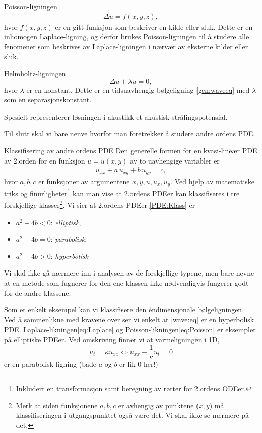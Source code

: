 \begin{eks}{Poisson-ligningen}
\begin{align}\label{eq:Poisson}
\Delta u = f(x, y, z),
\end{align}
hvor \( f(x, y, z) \) er en gitt funksjon som beskriver en kilde eller sluk. Dette er en inhomogen Laplace-ligning, og derfor brukes Poisson-ligningen til å studere alle fenomener som beskrives av Laplace-ligningen i nærvær av eksterne kilder eller sluk.
\end{eks}

\begin{eks}{Helmholtz-ligningen}
\[
\Delta u + \lambda u = 0, 
\]
hvor \( \lambda \) er en konstant. Dette er en tidsuavhengig bølgeligning \eqref{gen:waveeq} med \( \lambda \) som en separasjonskonstant. 
\end{eks}
Spesielt representerer løsningen i akustikk et akustisk strålingspotensial.

Til slutt skal vi bare nenve hvorfor man foretrekker å studere andre ordens PDE. 

\begin{oppsum}{Klassifisering av andre ordens PDE}
Den generelle formen for en kvasi-lineær PDE av 2.orden for en funksjon \( u = u(x, y) \) av to uavhengige variabler er
\begin{align}\label{PDE:Klass}
u_{xx} + a\, u_{xy} + b\, u_{yy} = c,
\end{align}
hvor \(a, b, c\) er funksjoner av argumentene \( x, y, u, u_x, u_y \).
Ved hjelp av matematiske triks og finurligheter\footnote{Inkludert en transformasjon samt beregning av røtter for 2.ordens ODEer.} kan man vise at 2.ordens PDEer kan klassifiseres i tre forskjellige klasser\footnote{Merk at siden funksjonene $a,b,c$ er avhengig av punktene ($x,y$) må klassifiseringen i utgangspunktet også være det. Vi skal ikke se nærmere på det.}. Vi sier at 2.ordens PDEer \eqref{PDE:Klass} er 
\begin{itemize}
\item $a^2-4b<0$:  \emph{elliptisk},
\item $a^2-4b=0$:  \emph{parabolisk},
\item $a^2-4b>0$:  \emph{hyperbolisk}
\end{itemize}
Vi skal ikke gå nærmere inn i analysen av de forskjellige typene, men bare nevne at en metode som fugnerer for den ene klassen ikke nødvendigvis fungerer godt for de andre klassene. 

Som et enkelt eksempel kan vi klassifisere den éndimensjonale bølgeligningen. Ved å sammenlikne med kravene over ser vi enkelt at \eqref{wave:eq} er en hyperbolisk PDE. Laplace-likningen\eqref{eq:Laplace} og Poisson-likningen\eqref{eq:Poisson} er eksempler på elliptiske PDEer. Ved omskriving finner vi at varmeligningen i 1D,
\[u_t= \kappa u_{xx} \Leftrightarrow u_{xx} - \frac{1}{\kappa} u_t = 0\]
er en parabolisk ligning (både $a$ og $b$ er lik $0$ her!)
\end{oppsum}

